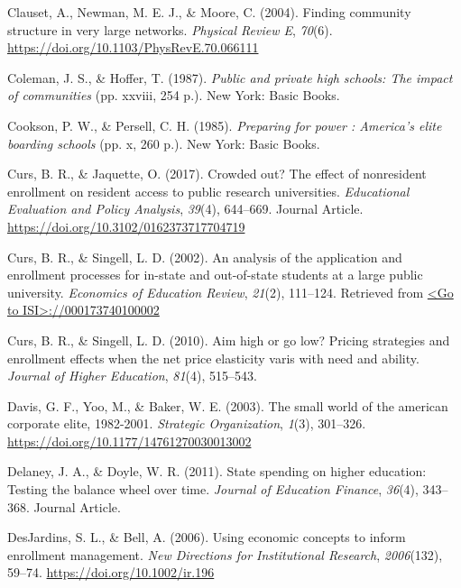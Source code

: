 \documentclass[
  12pt,
]{article}
\newlength{\cslhangindent}
\newenvironment{CSLReferences}[2] %
 {\begin{list}{}{%
  \setlength{\itemindent}{0pt}
  \setlength{\leftmargin}{0pt}
  \setlength{\parsep}{0pt}
  \ifodd #1
   \setlength{\leftmargin}{\cslhangindent}
   \setlength{\itemindent}{-1\cslhangindent}
  \fi
  \setlength{\itemsep}{#2\baselineskip}}}
 {\end{list}}
\begin{document}
\begin{CSLReferences}{1}{0}
Clauset, A., Newman, M. E. J., \& Moore, C. (2004). Finding community structure in very large networks. \emph{Physical Review E}, \emph{70}(6). \url{https://doi.org/10.1103/PhysRevE.70.066111}

Coleman, J. S., \& Hoffer, T. (1987). \emph{Public and private high schools: The impact of communities} (pp. xxviii, 254 p.). New York: Basic Books.

Cookson, P. W., \& Persell, C. H. (1985). \emph{Preparing for power : America's elite boarding schools} (pp. x, 260 p.). New York: Basic Books.

Curs, B. R., \& Jaquette, O. (2017). Crowded out? The effect of nonresident enrollment on resident access to public research universities. \emph{Educational Evaluation and Policy Analysis}, \emph{39}(4), 644--669. Journal Article. \url{https://doi.org/10.3102/0162373717704719}

Curs, B. R., \& Singell, L. D. (2002). An analysis of the application and enrollment processes for in-state and out-of-state students at a large public university. \emph{Economics of Education Review}, \emph{21}(2), 111--124. Retrieved from \href{\%3CGo\%20to\%20ISI\%3E://000173740100002}{\textless Go to ISI\textgreater://000173740100002}

Curs, B. R., \& Singell, L. D. (2010). Aim high or go low? Pricing strategies and enrollment effects when the net price elasticity varis with need and ability. \emph{Journal of Higher Education}, \emph{81}(4), 515--543.

Davis, G. F., Yoo, M., \& Baker, W. E. (2003). The small world of the american corporate elite, 1982-2001. \emph{Strategic Organization}, \emph{1}(3), 301--326. \url{https://doi.org/10.1177/14761270030013002}

Delaney, J. A., \& Doyle, W. R. (2011). State spending on higher education: Testing the balance wheel over time. \emph{Journal of Education Finance}, \emph{36}(4), 343--368. Journal Article.

DesJardins, S. L., \& Bell, A. (2006). Using economic concepts to inform enrollment management. \emph{New Directions for Institutional Research}, \emph{2006}(132), 59--74. \url{https://doi.org/10.1002/ir.196}


\end{CSLReferences}
\end{document}
